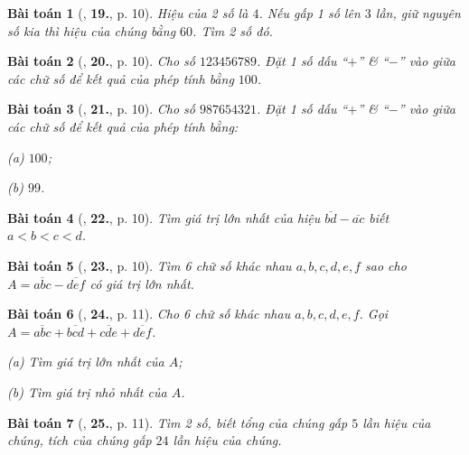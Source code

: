 \documentclass{article}
\numberwithin{equation}{section}
\newtheorem{baitoan}{Bài toán}
\begin{document}
\begin{baitoan}[\cite{Binh_Toan_6_tap_1}, \textbf{19.}, p. 10]
	Hiệu của 2 số là $4$. Nếu gấp 1 số lên $3$ lần, giữ nguyên số kia thì hiệu của chúng bằng $60$. Tìm 2 số đó.
\end{baitoan}

\begin{baitoan}[\cite{Binh_Toan_6_tap_1}, \textbf{20.}, p. 10]
	Cho số $123456789$. Đặt 1 số dấu ``$+$'' \& ``$-$'' vào giữa các chữ số để kết quả của phép tính bằng $100$.
\end{baitoan}

\begin{baitoan}[\cite{Binh_Toan_6_tap_1}, \textbf{21.}, p. 10]
	Cho số $987654321$. Đặt 1 số dấu ``$+$'' \& ``$-$'' vào giữa các chữ số để kết quả của phép tính bằng:
	\begin{enumerate*}
		\item[(a)] $100$;
		\item[(b)] $99$.
	\end{enumerate*}
\end{baitoan}

\begin{baitoan}[\cite{Binh_Toan_6_tap_1}, \textbf{22.}, p. 10]
	Tìm giá trị lớn nhất của hiệu $\overline{bd} - \overline{ac}$ biết $a < b < c < d$.
\end{baitoan}

\begin{baitoan}[\cite{Binh_Toan_6_tap_1}, \textbf{23.}, p. 10]
	Tìm 6 chữ số khác nhau $a,b,c,d,e,f$ sao cho $A = \overline{abc} - \overline{def}$ có giá trị lớn nhất.
\end{baitoan}

\begin{baitoan}[\cite{Binh_Toan_6_tap_1}, \textbf{24.}, p. 11]
	Cho 6 chữ số khác nhau $a,b,c,d,e,f$. Gọi $A = \overline{abc} + \overline{bcd} + \overline{cde} + \overline{def}$.
	\begin{enumerate*}
		\item[(a)] Tìm giá trị lớn nhất của $A$;
		\item[(b)] Tìm giá trị nhỏ nhất của $A$.
	\end{enumerate*}
\end{baitoan}

\begin{baitoan}[\cite{Binh_Toan_6_tap_1}, \textbf{25.}, p. 11]
	Tìm 2 số, biết tổng của chúng gấp $5$ lần hiệu của chúng, tích của chúng gấp $24$ lần hiệu của chúng.
\end{baitoan}
\end{document}
